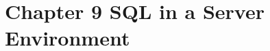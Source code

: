 \documentclass[../../main.tex]{subfiles}
\begin{document}
\section{Chapter 9 SQL in a Server Environment}








\end{document}

